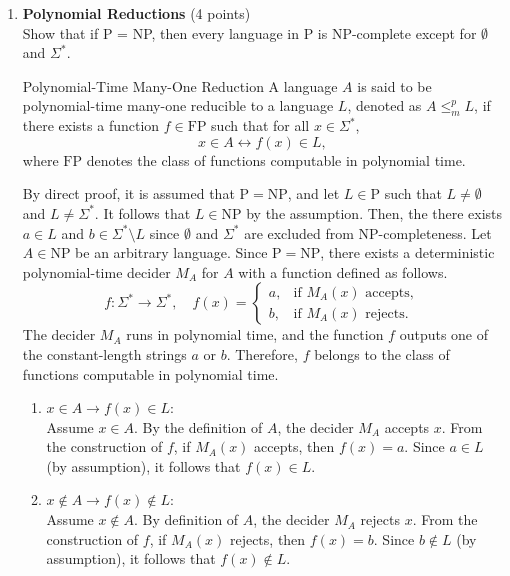 \begin{enumerate}
    \item \textbf{Polynomial Reductions} (4 points)\\
    Show that if P = NP, then every language in P is NP-complete 
    except for $\emptyset$ and $\Sigma^*$.
    \begin{define}{Polynomial-Time Many-One Reduction}
    A language \(A\) is said to be polynomial-time many-one reducible to a language \(L\), denoted as \(A \le^p_m L\), if there exists a function \(f \in \mathrm{FP}\) such that for all \(x \in \Sigma^*\),
    \[
    x \in A \leftrightarrow f(x) \in L,
    \]
    where \(\mathrm{FP}\) denotes the class of functions computable in polynomial time.
    \end{define}
    \begin{prove}
    By direct proof, it is assumed that 
    \(\mathrm{P} = \mathrm{NP}\), and let 
    \(L \in \mathrm{P}\) such that \(L \neq \emptyset\) and 
    \(L \neq \Sigma^*\).
    It follows that \(L \in \mathrm{NP}\) by the assumption. 
    Then, the there exists 
    \(a \in L\) and \(b \in \Sigma^* \setminus L\) since 
    $\emptyset$ and $\Sigma^*$ are 
    excluded from NP-completeness. Let \(A \in \mathrm{NP}\) 
    be an arbitrary language.
    Since \(\mathrm{P} = \mathrm{NP}\), there exists a 
    deterministic polynomial-time decider \(M_A\) for \(A\) 
    with a function defined as follows. 
    \[
    f : \Sigma^* \to \Sigma^*, 
    \quad
    f(x) =
    \begin{cases}
    a, & \text{if } M_A(x) \text{ accepts},\\
    b, & \text{if } M_A(x) \text{ rejects}.
    \end{cases}
    \]
    The decider \(M_A\) runs in polynomial time, and the function 
    \(f\) outputs one of the constant-length strings \(a\) or \(b\). 
    Therefore, \(f\) belongs to the class of functions computable in polynomial time.
    \begin{enumerate}
        \item \textbf{\(x \in A \to f(x) \in L\)}: \\
        Assume \(x \in A\). By the definition of \(A\), the decider 
        \(M_A\) accepts \(x\). From the construction of \(f\), if 
        \(M_A(x)\) accepts, then \(f(x) = a\). Since \(a \in L\) 
        (by assumption), it follows that \(f(x) \in L\).
        \item \textbf{\(x \notin A \to f(x) \notin L\)}: \\
        Assume \(x \notin A\).  By definition of \(A\), the decider 
        \(M_A\) rejects \(x\).  From the construction of \(f\), 
        if 
        \(M_A(x)\) rejects, then \(f(x)=b\).  Since \(b \notin L\) (by assumption), 
        it follows that \(f(x)\notin L\).



\end{enumerate}
\end{prove}
\end{enumerate}
